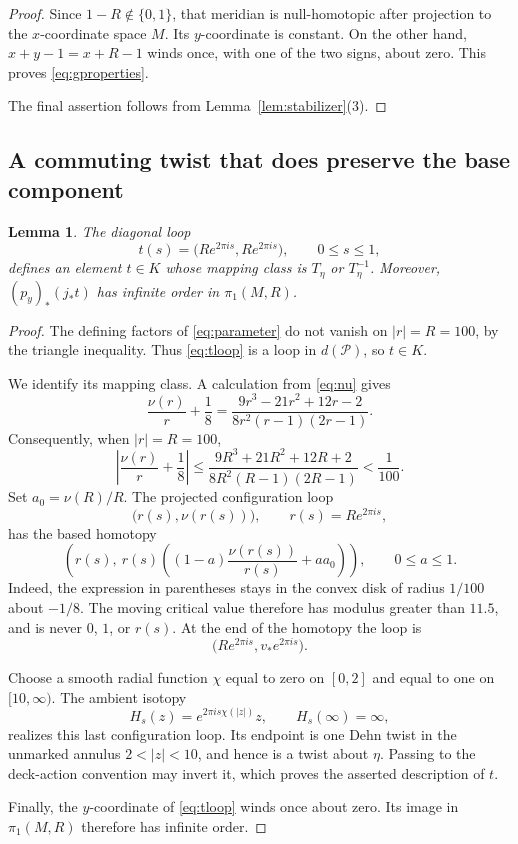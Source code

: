 \documentclass[11pt]{article}
\newcommand{\Par}{\mathcal P}
\newtheorem{lemma}[theorem]{Lemma}
\theoremstyle{definition}
\theoremstyle{remark}
\begin{document}
\begin{proof}
Since $1-R\notin\{0,1\}$, that meridian is null-homotopic after
projection to the $x$-coordinate space $M$.  Its $y$-coordinate is
constant.  On the other hand, $x+y-1=x+R-1$ winds once, with one of
the two signs, about zero.  This proves \eqref{eq:gproperties}.

The final assertion follows from Lemma~\ref{lem:stabilizer}(3).
\end{proof}

\subsection{A commuting twist that does preserve the base component}

\begin{lemma}\label{lem:cusp}
The diagonal loop
\begin{equation}\label{eq:tloop}
t(s)=\bigl(Re^{2\pi is},Re^{2\pi is}\bigr),
\qquad 0\le s\le1,
\end{equation}
defines an element $t\in K$ whose mapping class is
$T_\eta$ or $T_\eta^{-1}$.
Moreover, $(p_y)_*(j_*t)$ has infinite order in $\pi_1(M,R)$.
\end{lemma}

\begin{proof}
The defining factors of \eqref{eq:parameter} do not vanish on
$|r|=R=100$, by the triangle inequality.  Thus \eqref{eq:tloop}
is a loop in $d(\Par)$, so $t\in K$.

We identify its mapping class.  A calculation from \eqref{eq:nu}
gives
\[
\frac{\nu(r)}r+\frac18
=
\frac{9r^3-21r^2+12r-2}
     {8r^2(r-1)(2r-1)}.
\]
Consequently, when $|r|=R=100$,
\begin{equation}\label{eq:estimate}
\left|\frac{\nu(r)}r+\frac18\right|
\le
\frac{9R^3+21R^2+12R+2}
     {8R^2(R-1)(2R-1)}
<\frac1{100}.
\end{equation}
Set $a_0=\nu(R)/R$.
The projected configuration loop
\[
\bigl(r(s),\nu(r(s))\bigr),\qquad r(s)=Re^{2\pi is},
\]
has the based homotopy
\[
\left(
r(s),\
r(s)\left((1-a)\frac{\nu(r(s))}{r(s)}+aa_0\right)
\right),
\qquad 0\le a\le1.
\]
Indeed, the expression in parentheses stays in the convex disk
of radius $1/100$ about $-1/8$.
The moving critical value therefore has modulus greater than
$11.5$, and is never $0$, $1$, or $r(s)$.
At the end of the homotopy the loop is
\[
\bigl(Re^{2\pi is},v_*e^{2\pi is}\bigr).
\]

Choose a smooth radial function $\chi$ equal to zero on $[0,2]$
and equal to one on $[10,\infty)$.
The ambient isotopy
\[
H_s(z)=e^{2\pi is\chi(|z|)}z,\qquad H_s(\infty)=\infty,
\]
realizes this last configuration loop.  Its endpoint is one Dehn
twist in the unmarked annulus $2<|z|<10$, and hence is a twist
about $\eta$.  Passing to the deck-action convention may invert
it, which proves the asserted description of $t$.

Finally, the $y$-coordinate of \eqref{eq:tloop} winds once about zero.
Its image in $\pi_1(M,R)$ therefore has infinite order.
\end{proof}
\end{document}
